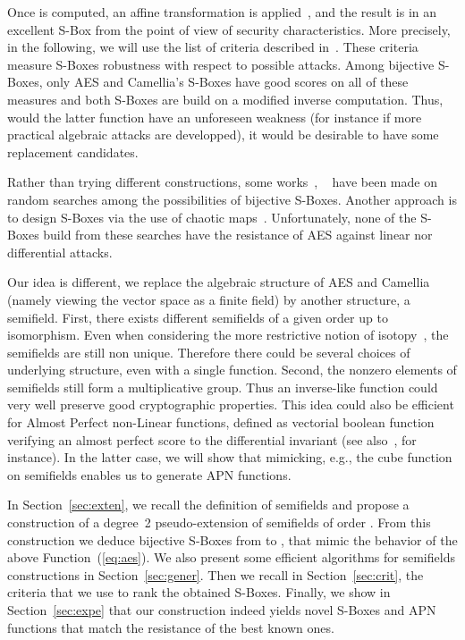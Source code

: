 \documentclass{article}\usepackage{amsthm}
\newcommand{\SBox}{S-Box\xspace}
\newcommand{\SBoxes}{S-Boxes\xspace}
\begin{document}
Once  is computed, an affine transformation is
applied~\cite{Daemen:1998:rijndael}, and the result is in an excellent \SBox
from the point 
of view of security characteristics. More precisely, in the following, we will
use the list of criteria described in~\cite{Alvarez:2008:apn}. 
These criteria measure \SBoxes robustness with respect to possible attacks.
Among bijective \SBoxes, only AES and Camellia's \SBoxes have good scores on all
of these measures and both \SBoxes are build on a modified inverse computation.
Thus, would the latter function have an unforeseen weakness (for instance if
more practical algebraic attacks are developped), it would be desirable to have
some replacement candidates. 


Rather than trying different constructions, some works~\cite{Alvarez:2008:apn},
~\cite{Danjean:2007:pasco}  have been made on random searches among the 
possibilities of bijective \SBoxes. 
Another approach is to design \SBoxes via the use of chaotic
maps~\cite{Hussain:2012:chaotic}.
Unfortunately, none of the \SBoxes build from these searches have the resistance
of AES against linear nor differential attacks.

Our idea is different, we replace the algebraic structure of AES and Camellia
(namely viewing the vector space as a finite field) by another structure, a
semifield. 
First, there exists different semifields of a given order up to isomorphism. 
Even when considering the more restrictive notion of isotopy~\cite{Albert:1960:finite}, the
semifields are still non unique. Therefore there could be several choices of
underlying structure, even with a single function.
Second, the nonzero elements of semifields still form a multiplicative group. 
Thus an inverse-like function could very well preserve good cryptographic
properties.
This idea could also be efficient for Almost Perfect non-Linear functions, defined as vectorial boolean function
verifying an almost perfect score to the differential invariant (see
also~\cite{Alvarez:2008:apn}, for instance). In the latter case, we will show that mimicking,
e.g., the cube function on semifields enables us to generate
APN functions.








In Section~\ref{sec:exten}, we recall the definition of semifields and propose a
construction of a degree~2 pseudo-extension of semifields of order . 
From this construction we deduce bijective \SBoxes from  to , that mimic
the behavior of the above Function~(\ref{eq:aes}). 
We also present some efficient algorithms for semifields constructions in
Section~\ref{sec:gener}. 
Then we recall in Section~\ref{sec:crit}, the criteria that we use to rank the
obtained \SBoxes.
Finally, we show in Section~\ref{sec:expe} that our construction indeed yields
novel \SBoxes and APN functions that match the resistance of the best known ones.
\end{document}
